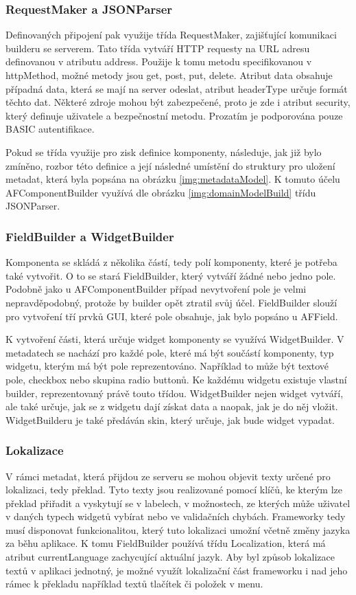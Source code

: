 \subsubsection{RequestMaker a JSONParser}
Definovaných připojení pak využije třída RequestMaker, zajišťující komunikaci builderu se serverem. Tato třída vytváří HTTP requesty na URL adresu definovanou v atributu address. Použije k tomu metodu specifikovanou v httpMethod, možné metody jsou get, post, put, delete. Atribut data obsahuje případná data, která se mají na server odeslat, atribut headerType určuje formát těchto dat. Některé zdroje mohou být zabezpečené, proto je zde i atribut security, který definuje uživatele a bezpečnostní metodu. Prozatím je podporována pouze BASIC autentifikace.

Pokud se třída využije pro zisk definice komponenty, následuje, jak již bylo zmíněno, rozbor této definice a její následné umístění do struktury pro uložení metadat, která byla popsána na obrázku \ref{img:metadataModel}. K tomuto účelu AFComponentBuilder využívá dle obrázku \ref{img:domainModelBuild} třídu JSONParser. 

\subsubsection{FieldBuilder a WidgetBuilder}
Komponenta se skládá z několika částí, tedy polí komponenty, které je potřeba také vytvořit. O to se stará FieldBuilder, který vytváří žádné nebo jedno pole. Podobně jako u AFComponentBuilder případ nevytvoření pole je velmi nepravděpodobný, protože by builder opět ztratil svůj účel. FieldBuilder slouží pro vytvoření tří prvků GUI, které pole obsahuje, jak bylo popsáno u AFField. 

K vytvoření části, která určuje widget komponenty se využívá WidgetBuilder. V metadatech se nachází pro každé pole, které má být součástí komponenty, typ widgetu, kterým má být pole reprezentováno. Například to může být textové pole, checkbox nebo skupina radio buttonů. Ke každému widgetu existuje vlastní builder, reprezentovaný právě touto třídou. WidgetBuilder nejen widget vytváří, ale také určuje, jak se z widgetu dají získat data a naopak, jak je do něj vložit. WidgetBuilderu je také předáván skin, který určuje, jak bude widget vypadat.

\subsubsection{Lokalizace}
V rámci metadat, která přijdou ze serveru se mohou objevit texty určené pro lokalizaci, tedy překlad. Tyto texty jsou realizované pomocí klíčů, ke kterým lze překlad přiřadit a vyskytují se v labelech, v možnostech, ze kterých může uživatel v daných typech widgetů vybírat nebo ve validačních chybách. Frameworky tedy musí disponovat funkcionalitou, který tuto lokalizaci umožní včetně změny jazyka za běhu aplikace. K tomu FieldBuilder používá třídu Localization, která má atribut currentLanguage zachycující aktuální jazyk. Aby byl způsob lokalizace textů v aplikaci jednotný, je možné využít lokalizační část frameworku i nad jeho rámec k překladu například textů tlačítek či položek v menu. 

